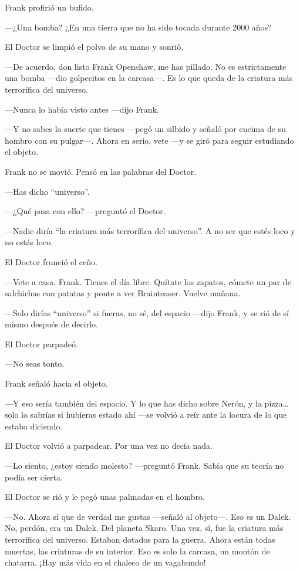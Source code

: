 Frank profirió un bufido.

---¿Una bomba? ¿En una tierra que no ha sido tocada durante 2000 años?

El Doctor se limpió el polvo de su mano y sonrió.

---De acuerdo, don listo Frank Openshaw, me has pillado. No es
estrictamente una bomba ---dio golpecitos en la carcasa---. Es lo que
queda de la criatura más terrorífica del universo.

---Nunca lo había visto antes ---dijo Frank.

---Y no sabes la suerte que tienes ---pegó un silbido y señaló por encima
de su hombro con su pulgar---. Ahora en serio, vete ---y se giró para
seguir estudiando el objeto.

Frank no se movió. Pensó en las palabras del Doctor.

---Has dicho ``universo''.

---¿Qué pasa con ello? ---preguntó el Doctor.

---Nadie diría ``la criatura más terrorífica del universo''. A no ser que
estés loco y no estás loco.

El Doctor frunció el ceño.

---Vete a casa, Frank. Tienes el día libre. Quítate los zapatos, cómete
un par de salchichas con patatas y ponte a ver Brainteaser. Vuelve
mañana.

---Solo dirías ``universo'' si fueras, no sé, del espacio ---dijo Frank, y
se rió de sí mismo después de decirlo.

El Doctor parpadeó.

---No seas tonto.

Frank señaló hacia el objeto.

---Y eso sería también del espacio. Y lo que has dicho sobre Nerón, y la
pizza\ldots{} solo lo sabrías si hubieras estado ahí ---se volvió a reír
ante la locura de lo que estaba diciendo.

El Doctor volvió a parpadear. Por una vez no decía nada.

---Lo siento, ¿estoy siendo molesto? ---preguntó Frank. Sabía que su
teoría no podía ser cierta.

El Doctor se rió y le pegó unas palmadas en el hombro.

---No. Ahora sí que de verdad me gustas ---señaló al objeto---. Eso es un
Dalek. No, perdón, era un Dalek. Del planeta Skaro. Una vez, sí, fue la
criatura más terrorífica del universo. Estaban dotados para la guerra.
Ahora están todas muertas, las criaturas de su interior. Eso es solo la
carcasa, un montón de chatarra. ¡Hay más vida en el chaleco de un
vagabundo!


